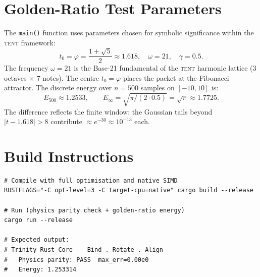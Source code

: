 \documentclass[11pt,a4paper]{article}
\theoremstyle{definition}
\newcommand{\TENT}{\textsc{tent}}
\newcommand{\CB}[1]{\texttt{#1}}
\begin{document}
\appendix
\section{Golden-Ratio Test Parameters}
\label{app:golden}

The \CB{main()} function uses parameters chosen for symbolic
significance within the \TENT{} framework:
\begin{equation}
  t_0 = \varphi = \frac{1+\sqrt{5}}{2} \approx 1.618,
  \quad
  \omega = 21,
  \quad
  \gamma = 0.5.
\end{equation}
The frequency $\omega = 21$ is the Base-21 fundamental of the \TENT{}
harmonic lattice (3 octaves $\times$ 7 notes).
The centre $t_0 = \varphi$ places the packet at the Fibonacci attractor.
The discrete energy over $n = 500$ samples on $[-10, 10]$ is:
\begin{equation}
  E_{500} \approx 1.2533, \qquad
  E_{\infty} = \sqrt{\pi/(2 \cdot 0.5)} = \sqrt{\pi} \approx 1.7725.
\end{equation}
The difference reflects the finite window: the Gaussian tails beyond
$|t - 1.618| > 8$ contribute $\approx e^{-30} \approx 10^{-13}$ each.

\section{Build Instructions}
\label{app:build}

\begin{lstlisting}[language={},caption={Build, run, and verify Trinity Core}]
# Compile with full optimisation and native SIMD
RUSTFLAGS="-C opt-level=3 -C target-cpu=native" cargo build --release

# Run (physics parity check + golden-ratio energy)
cargo run --release

# Expected output:
# Trinity Rust Core -- Bind . Rotate . Align
#   Physics parity: PASS  max_err=0.00e0
#   Energy: 1.253314
\end{lstlisting}
\end{document}
